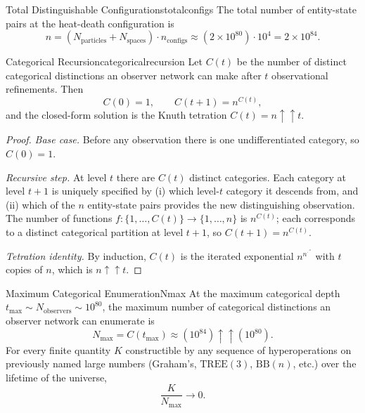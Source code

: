 \begin{consequence}{Total Distinguishable Configurations}{totalconfigs}
  The total number of entity-state pairs at the heat-death configuration is
  \begin{equation}
    n = (N_{\mathrm{particles}} + N_{\mathrm{spaces}})\cdot n_{\mathrm{configs}}
      \approx (2\times10^{80})\cdot 10^{4} = 2\times10^{84}.
  \end{equation}
\end{consequence}

\begin{consequence}{Categorical Recursion}{categoricalrecursion}
  Let $C(t)$ be the number of distinct categorical distinctions an observer
  network can make after $t$ observational refinements.
  Then
  \begin{equation}
    C(0) = 1,\qquad C(t+1) = n^{C(t)},
  \end{equation}
  and the closed-form solution is the Knuth tetration $C(t) = n\uparrow\uparrow t$.
\end{consequence}

\begin{proof}
\emph{Base case.} Before any observation there is one undifferentiated category,
so $C(0) = 1$.

\emph{Recursive step.} At level $t$ there are $C(t)$ distinct categories.
Each category at level $t+1$ is uniquely specified by (i) which level-$t$
category it descends from, and (ii) which of the $n$ entity-state pairs provides
the new distinguishing observation.
The number of functions $f:\{1,\ldots,C(t)\}\to\{1,\ldots,n\}$ is $n^{C(t)}$;
each corresponds to a distinct categorical partition at level $t+1$, so
$C(t+1) = n^{C(t)}$.

\emph{Tetration identity.} By induction, $C(t)$ is the iterated exponential
$n^{n^{\cdot^{\cdot^{n}}}}$ with $t$ copies of $n$, which is $n\uparrow\uparrow t$.
\end{proof}

\begin{consequence}{Maximum Categorical Enumeration}{Nmax}
  At the maximum categorical depth $t_{\max} \sim N_{\mathrm{observers}} \sim 10^{80}$,
  the maximum number of categorical distinctions an observer network can
  enumerate is
  \begin{equation}
    N_{\max} = C(t_{\max}) \approx (10^{84})\uparrow\uparrow(10^{80}).
  \end{equation}
  For every finite quantity $K$ constructible by any sequence of hyperoperations
  on previously named large numbers (Graham's, $\mathrm{TREE}(3)$, $\mathrm{BB}(n)$,
  etc.) over the lifetime of the universe,
  \begin{equation}
    \frac{K}{N_{\max}} \to 0.
  \end{equation}
\end{consequence}


